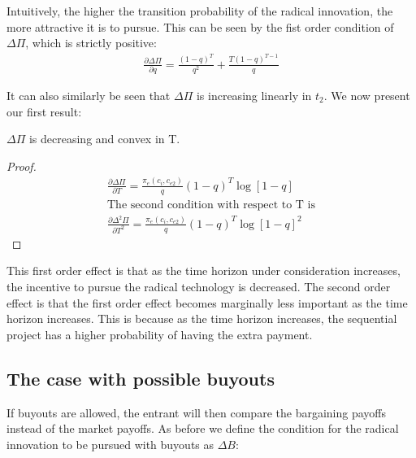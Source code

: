 Intuitively, the higher the transition probability of the radical innovation, the more attractive it is to pursue. This can be seen by the fist order condition of $\Delta \Pi$, which is strictly positive: 
\begin{align*}
\frac{\partial \Delta \Pi}{\partial q} = \frac{(1-q)^T}{q^2}+\frac{T (1-q)^{T-1}}{q}
\end{align*} 

It can also similarly be seen that $\Delta \Pi$ is increasing linearly in $t_2$. We now present our first result:  

\begin{proposition}
$\Delta \Pi$ is decreasing and convex in T.
\end{proposition}

\begin{proof}
\begin{align*}
\frac{\partial \Delta \Pi}{\partial T}=\frac{\pi_{e}(c_i,c_{e2})}{q} (1-q)^{T} \log[1-q] \\
\text{The second condition with respect to T is} \\
\frac{\partial \Delta^2 \Pi}{\partial T^2} = \frac{\pi_{e}(c_i,c_{e2})}{q} (1-q)^{T} \log[1-q]^2
\end{align*}
\end{proof}

This first order effect is that as the time horizon under consideration increases, the incentive to pursue the radical technology is decreased. The second order effect is that the first order effect becomes marginally less important as the time horizon increases. This is because as the time horizon increases, the sequential project has a higher probability of having the extra payment. 

\subsection{The case with possible buyouts}
If buyouts are allowed, the entrant will then compare the bargaining payoffs instead of the market payoffs. As before we define the condition for the radical innovation to be pursued with buyouts as $\Delta B$: 

